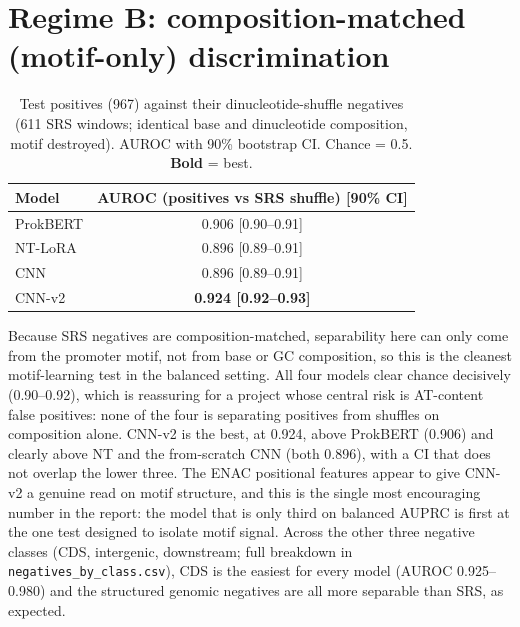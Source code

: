 \documentclass{article}
\begin{document}
\section{Regime B: composition-matched (motif-only) discrimination}
\begin{table}[h]
\centering
\caption{Test positives (967) against their dinucleotide-shuffle negatives (611 SRS windows; identical base and dinucleotide composition, motif destroyed). AUROC with 90\% bootstrap CI. Chance = 0.5. \textbf{Bold} = best.}
\begin{tabular}{lc}
\toprule
Model & AUROC (positives vs SRS shuffle) [90\% CI] \\
\midrule
ProkBERT & 0.906 [0.90--0.91] \\
NT-LoRA  & 0.896 [0.89--0.91] \\
CNN      & 0.896 [0.89--0.91] \\
CNN-v2   & \textbf{0.924 [0.92--0.93]} \\
\bottomrule
\end{tabular}
\end{table}

Because SRS negatives are composition-matched, separability here can only come from the promoter motif, not from base or GC composition, so this is the cleanest motif-learning test in the balanced setting. All four models clear chance decisively (0.90--0.92), which is reassuring for a project whose central risk is AT-content false positives: none of the four is separating positives from shuffles on composition alone. CNN-v2 is the best, at 0.924, above ProkBERT (0.906) and clearly above NT and the from-scratch CNN (both 0.896), with a CI that does not overlap the lower three. The ENAC positional features appear to give CNN-v2 a genuine read on motif structure, and this is the single most encouraging number in the report: the model that is only third on balanced AUPRC is first at the one test designed to isolate motif signal. Across the other three negative classes (CDS, intergenic, downstream; full breakdown in \texttt{negatives\_by\_class.csv}), CDS is the easiest for every model (AUROC 0.925--0.980) and the structured genomic negatives are all more separable than SRS, as expected.
\end{document}
